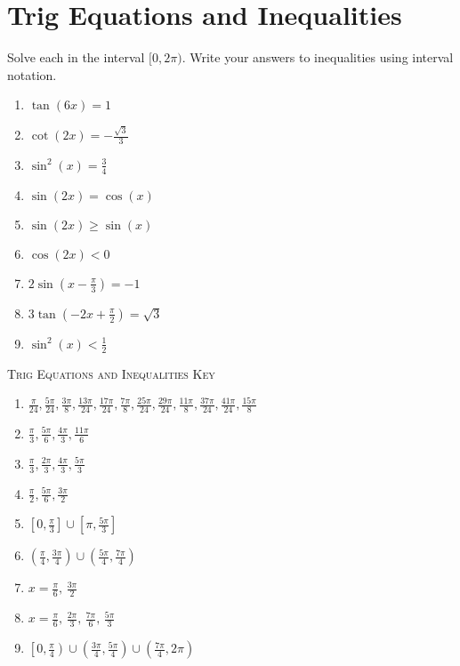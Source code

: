 \chapter{Trig Equations and Inequalities}

Solve each in the interval $[0,2\pi)$. Write your answers to inequalities using interval notation.

\begin{enumerate}
	\item $\tan(6x) = 1$
    \item $\cot(2x) = -\frac{\sqrt{3}}{3}$
    \item $\sin^2 (x) = \frac{3}{4}$
    \item $\sin(2x) = \cos(x)$
    \item $\sin(2x) \geq \sin(x)$
    \item $\cos(2x) < 0$
    \item $2\sin\left(x-\frac{\pi}{3}\right) = -1$
    \item $3\tan\left(-2x+\frac{\pi}{2}\right)=\sqrt{3}$
    \item $\sin^2(x) < \frac{1}{2}$
\end{enumerate}

\newpage

\textsc{Trig Equations and Inequalities Key}

\begin{enumerate}
	\item $\frac{\pi}{24}, \frac{5\pi}{24}, \frac{3\pi}{8}, \frac{13\pi}{24}, \frac{17\pi}{24}, \frac{7\pi}{8}, \frac{25\pi}{24}, \frac{29\pi}{24}, \frac{11\pi}{8}, \frac{37\pi}{24}, \frac{41\pi}{24}, \frac{15\pi}{8}$
    
	\item $\frac{\pi}{3}, \frac{5\pi}{6}, \frac{4\pi}{3}, \frac{11\pi}{6}$
    
	\item $\frac{\pi}{3}, \frac{2\pi}{3}, \frac{4\pi}{3}, \frac{5\pi}{3}$
    
	\item $\frac{\pi}{2}, \frac{5\pi}{6}, \frac{3\pi}{2}$
    
	\item $\left[0, \frac{\pi}{3}\right] \cup \left[\pi, \frac{5\pi}{3}\right]$
    
	\item $\left(\frac{\pi}{4}, \frac{3\pi}{4}\right) \cup \left(\frac{5\pi}{4}, \frac{7\pi}{4}\right)$
	
	\item $x = \frac{\pi}{6}, \, \frac{3\pi}{2}$
	
	\item $x = \frac{\pi}{6}, \, \frac{2\pi}{3}, \, \frac{7\pi}{6}, \, \frac{5\pi}{3}$
	
    \item $\left[0, \frac{\pi}{4}\right) \cup \left(\frac{3\pi}{4}, \frac{5\pi}{4}\right) \cup \left(\frac{7\pi}{4}, 2\pi\right)$
\end{enumerate}